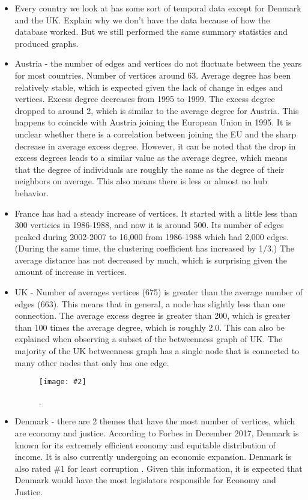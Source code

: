 \documentclass[12pt]{article}
\newcommand{\image}[5][0.6]{
  \begin{figure}[H]
    \centering
    \texttt{[image: \#2]}
    \caption[(details)]{\textbf{#4}. #5}
    \label{fig:#3}
  \end{figure}}
\begin{document}
\begin{itemize}
  \item Every country we look at has some sort of temporal data except for Denmark and the UK. Explain why we don't have the data because of how the database worked. But we still performed the same summary statistics and produced graphs.
  \item Austria - the number of edges and vertices do not fluctuate between the years for most countries. Number of vertices around 63. Average degree has been relatively stable, which is expected given the lack of change in edges and vertices. Excess degree decreases from 1995 to 1999. The excess degree dropped to around 2, which is similar to the average degree for Austria. This happens to coincide with Austria joining the European Union in 1995. It is unclear whether there is a correlation between joining the EU and the sharp decrease in average excess degree. However, it can be noted that the drop in excess degrees leads to a similar value as the average degree, which means that the degree of individuals are roughly the same as the degree of their neighbors on average. This also means there is less or almost no hub behavior.
  \item France has had a steady increase of vertices. It started with a little less than 300 verticies in 1986-1988, and now it is around 500. Its number of edges peaked during 2002-2007 to 16,000 from 1986-1988 which had 2,000 edges. (During the same time, the clustering coefficient has increased by 1/3.) The average distance has not decreased by much, which is surprising given the amount of increase in vertices.
  \item UK - Number of averages vertices (675) is greater than the average number of edges (663). This means that in general, a node has slightly less than one connection. The average excess degree is greater than 200, which is greater than 100 times the average degree, which is roughly 2.0. This can also be explained when observing a subset of the betweenness graph of UK. The majority of the UK betweenness graph has a single node that is connected to many other nodes that only has one edge. 
  \image[0.2]{Images/uk-betweenness.png}{}{}{}
  \item Denmark - there are 2 themes that have the most number of vertices, which are economy and justice. According to Forbes in December 2017, Denmark is known for its extremely efficient economy and equitable distribution of income. It is also currently undergoing an economic expansion. Denmark is also rated \#1 for least corruption \cite{denmark}. Given this information, it is expected that Denmark would have the most legislators responsible for Economy and Justice.

\end{itemize}
\end{document}
